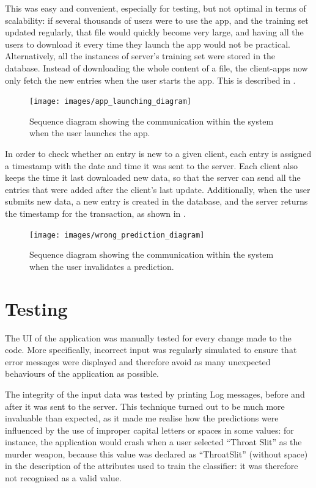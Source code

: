 \documentclass{mproj}
\begin{document}
This was easy and convenient, especially for testing, but not optimal in terms of scalability: if several thousands of users were to use the app, and the training set updated regularly, that file would quickly become very large, and having all the users to download it every time they launch the app would not be practical. Alternatively, all the instances of server's training set were stored in the database. Instead of downloading the whole content of a file, the client-apps now only fetch the new entries when the user starts the app. This is described in .

\begin{figure}[h]
	\centering
	\texttt{[image: images/app\_launching\_diagram]}
	\caption{Sequence diagram showing the communication within the system when the user launches the app.}
	\label{fig:launch}
\end{figure}

In order to check whether an entry is new to a given client, each entry is assigned a timestamp with the date and time it was sent to the server. Each client also keeps the time it last downloaded new data, so that the server can send all the entries that were added after the client's last update. Additionally, when the user submits new data, a new entry is created in the database, and the server returns the timestamp for the transaction, as shown in .

\begin{figure}[h]
	\centering
	\texttt{[image: images/wrong\_prediction\_diagram]}
	\caption{Sequence diagram showing the communication within the system when the user invalidates a prediction.}
	\label{fig:new_entry}
\end{figure}


\section{Testing}

The UI of the application was manually tested for every change made to the code. More specifically, incorrect input was regularly simulated to ensure that error messages were displayed and therefore avoid as many unexpected behaviours of the application as possible.

The integrity of the input data was tested by printing Log messages, before and after it was sent to the server. This technique turned out to be much more invaluable than expected, as it made me realise how the predictions were influenced by the use of improper capital letters or spaces in some values: for instance, the application would crash when a user selected ``Throat Slit'' as the murder weapon, because this value was declared as ``ThroatSlit'' (without space) in the description of the attributes used to train the classifier: it was therefore not recognised as a valid value. 
\end{document}

